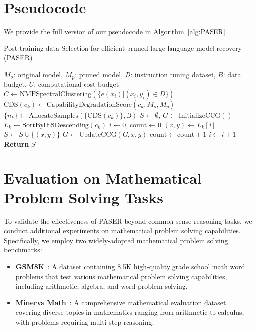 \section{Pseudocode}
\label{appendix:alg}
We provide the full version of our pseudocode in Algorithm~\ref{alg:PASER}.
\begin{algorithm}
\caption{Post-training data Selection for efficient pruned large language model recovery (PASER)}
\label{alg:PASER}
\begin{algorithmic}
\REQUIRE $M_o$: original model, $M_p$: pruned model, $D$: instruction tuning dataset, $B$: data budget, $U$: computational cost budget
    \STATE $C \gets \text{NMFSpectralClustering} (\{e(x_i) | (x_i, y_i) \in D\})$
    \STATE $\text{CDS}(c_k) \gets \text{CapabilityDegradationScore}(c_k, M_o, M_p)$
    \ENDFOR
    \STATE $\{n_k\} \gets \text{AllocateSamples}(\{\text{CDS}(c_k)\}, B)$
    \STATE $S \gets \emptyset$, $G \gets \text{InitializeCCG}()$
        \STATE $L_k \gets \text{SortByIESDescending}(c_k)$
        \STATE $i \gets 0$, $\text{count} \gets 0$
            \STATE $(x, y) \gets L_k[i]$
                \STATE $S \gets S \cup \{(x, y)\}$
                \STATE $G \gets \text{UpdateCCG}(G, x, y)$
                \STATE $\text{count} \gets \text{count} + 1$
            \ENDIF
            \STATE $i \gets i + 1$
        \ENDWHILE
    \ENDFOR
    \STATE \textbf{Return} $S$
\ENDFUNCTION
\end{algorithmic}
\end{algorithm}

\section{Evaluation on Mathematical Problem Solving Tasks}
\label{appendix: math}
To validate the effectiveness of PASER beyond common sense reasoning tasks, we conduct additional experiments on mathematical problem solving capabilities. Specifically, we employ two widely-adopted mathematical problem solving benchmarks:
\begin{itemize}[leftmargin=*]
   \item \textbf{GSM8K}~\citep{cobbe2021training}: A dataset containing 8.5K high-quality grade school math word problems that test various mathematical problem solving capabilities, including arithmetic, algebra, and word problem solving.
   \item \textbf{Minerva Math}~\citep{lewkowycz2022solving}: A comprehensive mathematical evaluation dataset covering diverse topics in mathematics ranging from arithmetic to calculus, with problems requiring multi-step reasoning.
\end{itemize}


